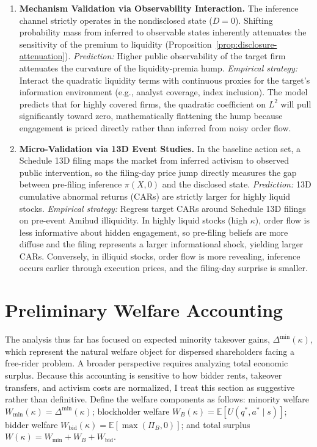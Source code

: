 \documentclass[11pt]{article}
\newcommand{\E}{\mathbb{E}}
\newcommand{\1}{\mathbf{1}}
\begin{document}
\begin{enumerate}[label=\textbf{\arabic*.}]
    \item \textbf{Mechanism Validation via Observability Interaction.} The inference channel strictly operates in the nondisclosed state ($D=0$). Shifting probability mass from inferred to observable states inherently attenuates the sensitivity of the premium to liquidity (Proposition~\ref{prop:disclosure-attenuation}).
    \emph{Prediction:} Higher public observability of the target firm attenuates the curvature of the liquidity-premia hump.
    \emph{Empirical strategy:} Interact the quadratic liquidity terms with continuous proxies for the target's information environment (e.g., analyst coverage, index inclusion). The model predicts that for highly covered firms, the quadratic coefficient on $L^2$ will pull significantly toward zero, mathematically flattening the hump because engagement is priced directly rather than inferred from noisy order flow.

\item \textbf{Micro-Validation via 13D Event Studies.} In the baseline action set, a Schedule 13D filing maps the market from inferred activism to observed public intervention, so the filing-day price jump directly measures the gap between pre-filing inference $\pi(X,0)$ and the disclosed state.
\emph{Prediction:} 13D cumulative abnormal returns (CARs) are strictly larger for highly liquid stocks.
\emph{Empirical strategy:} Regress target CARs around Schedule 13D filings on pre-event Amihud illiquidity. In highly liquid stocks (high $\kappa$), order flow is less informative about hidden engagement, so pre-filing beliefs are more diffuse and the filing represents a larger informational shock, yielding larger CARs. Conversely, in illiquid stocks, order flow is more revealing, inference occurs earlier through execution prices, and the filing-day surprise is smaller.
\end{enumerate}

\section{Preliminary Welfare Accounting}
\label{sec:welfare}

The analysis thus far has focused on expected minority takeover gains, $\Delta^{\min}(\kappa)$, which represent the natural welfare object for dispersed shareholders facing a free-rider problem. A broader perspective requires analyzing total economic surplus. Because this accounting is sensitive to how bidder rents, takeover transfers, and activism costs are normalized, I treat this section as suggestive rather than definitive. Define the welfare components as follows: minority welfare $W_{\text{min}}(\kappa) = \Delta^{\min}(\kappa)$; blockholder welfare $W_B(\kappa) = \E[U(q^*, a^* \mid s)]$; bidder welfare $W_{\text{bid}}(\kappa) = \E[\max(\Pi_B, 0)]$; and total surplus $W(\kappa) = W_{\text{min}} + W_B + W_{\text{bid}}$.
\end{document}
